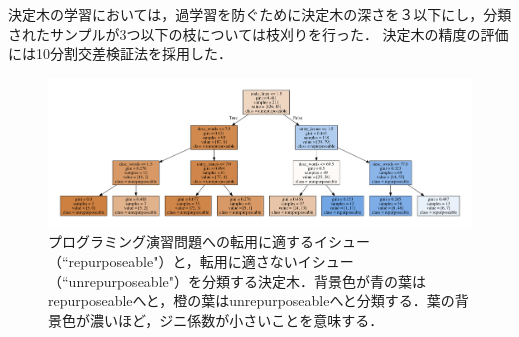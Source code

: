 
決定木の学習においては，過学習を防ぐために決定木の深さを３以下にし，分類されたサンプルが3つ以下の枝については枝刈りを行った．
決定木の精度の評価には10分割交差検証法を採用した．




\begin{figure}[t]
	\centering
  \includegraphics[width=1.0\columnwidth]{graph_20181005.png}
  \caption{プログラミング演習問題への転用に適するイシュー（``repurposeable"）と，転用に適さないイシュー（``unrepurposeable"）を分類する決定木．背景色が青の葉はrepurposeableへと，橙の葉はunrepurposeableへと分類する．葉の背景色が濃いほど，ジニ係数が小さいことを意味する．}
  \label{fig:dtgraph}
\end{figure}



